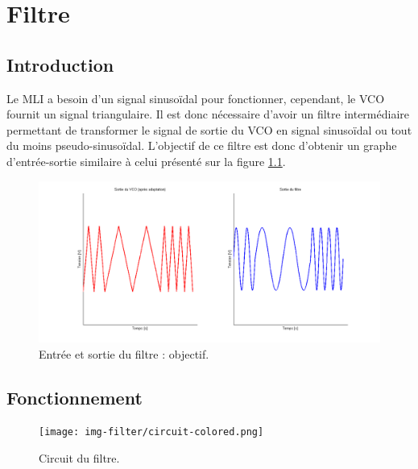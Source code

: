 \chapter{Filtre}
\label{sec:filtre}
\section{Introduction}
Le MLI a besoin d'un signal sinusoïdal pour fonctionner, cependant, le VCO fournit un
signal triangulaire. Il est donc nécessaire d'avoir un filtre intermédiaire permettant
de transformer le signal de sortie du VCO en signal sinusoïdal ou tout du moins pseudo-sinusoïdal.
L'objectif de ce filtre est donc d'obtenir un graphe d'entrée-sortie similaire à
celui présenté sur la figure \ref{fig:filter-in-out}.

\begin{figure}[ht]
	\centering
	\includegraphics[scale=0.4]{img-filter/in-out.png}
	\caption{Entrée et sortie du filtre : objectif.}
	\label{fig:filter-in-out}
\end{figure}

\section{Fonctionnement}

\begin{figure}[ht]
	\centering
	\texttt{[image: img-filter/circuit-colored.png]}
	\caption{Circuit du filtre.}
	\label{fig:circuit-filtre}
\end{figure}

